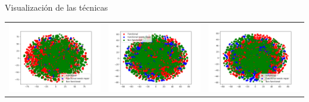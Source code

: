 \begin{frame}{Visualización de las técnicas}
\begin{tabular}{ccc}
		\includegraphics[scale=0.21]{./figures/knn/IPF_2d.png} & \includegraphics[scale=0.21]{./figures/knn/SMOTE_2d.png} & 
		\includegraphics[scale=0.21]{./figures/knn/anomalias_knn_2d.png}
	\end{tabular}
\end{frame}

